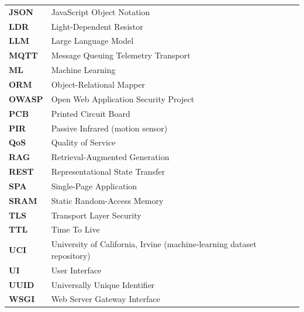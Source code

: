 {\begin{longtable}{@{}p{3.2cm} p{11cm}@{}}
\textbf{JSON}   & JavaScript Object Notation \\
\textbf{LDR}    & Light-Dependent Resistor \\
\textbf{LLM}    & Large Language Model \\
\textbf{MQTT}   & Message Queuing Telemetry Transport \\
\textbf{ML}     & Machine Learning \\
\textbf{ORM}    & Object-Relational Mapper \\
\textbf{OWASP}  & Open Web Application Security Project \\
\textbf{PCB}    & Printed Circuit Board \\
\textbf{PIR}    & Passive Infrared (motion sensor) \\
\textbf{QoS}    & Quality of Service \\
\textbf{RAG}    & Retrieval-Augmented Generation \\
\textbf{REST}   & Representational State Transfer \\
\textbf{SPA}    & Single-Page Application \\
\textbf{SRAM}   & Static Random-Access Memory \\
\textbf{TLS}    & Transport Layer Security \\
\textbf{TTL}    & Time To Live \\
\textbf{UCI}    & University of California, Irvine (machine-learning dataset repository) \\
\textbf{UI}     & User Interface \\
\textbf{UUID}   & Universally Unique Identifier \\
\textbf{WSGI}   & Web Server Gateway Interface \\
\end{longtable}
} %

\pagebreak
